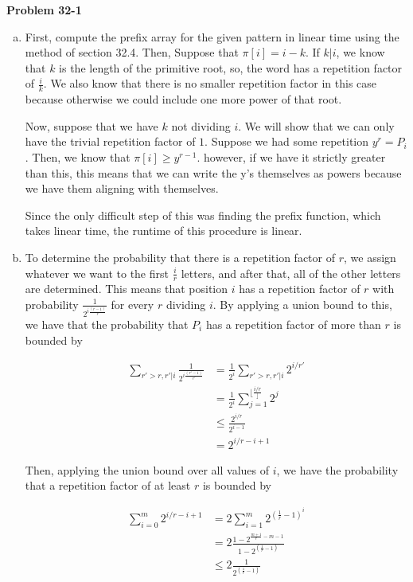 \documentclass{article}
\begin{document}
\noindent\textbf{Problem 32-1}\\
\begin{enumerate}[a.]
\item
First, compute the prefix array for the given pattern in linear time using the method of section 32.4. Then, Suppose that $\pi[i] = i-k$. If $k | i$, we know that $k$ is the length of the primitive root, so, the word has a repetition factor of $\frac{i}{k}$. We also know that there is no smaller repetition factor in this case because otherwise we could include one more power of that root.

Now, suppose that we have $k$ not dividing $i$. We will show that we can only have the trivial repetition factor of $1$. Suppose we had some repetition $y^r = P_i$. Then, we know that $\pi[i] \ge y^{r-1}$. however, if we have it strictly greater than this, this means that we can write the y's themselves as powers because we have them aligning with themselves.

Since the only difficult step of this was finding the prefix function, which takes linear time, the runtime of this procedure is linear.
\item
To determine the probability that there is a repetition factor of $r$, we assign whatever we want to the first $\frac{i}{r}$ letters, and after that, all of the other letters are determined. This means that position $i$ has a repetition factor of $r$ with probability $\frac{1}{2^{i\frac{(r-1)}{r}}}$ for every $r$ dividing $i$. By applying a union bound to this, we have that the probability that $P_i$ has a repetition factor of more than $r$ is bounded by

\begin{align*}
\sum_{r'>r, r'|i} \frac{1}{2^{i\frac{(r'-1)}{r'}}}& = \frac{1}{2^i}\sum_{r'>r, r' |i}2^{i/r'}\\
&= \frac{1}{2^i} \sum_{j=1}^{\lfloor\frac{i/r}\rfloor}2^{j}\\
&\le \frac{2^{i/r}}{2^{i-1}}\\
&=2^{i/r -i +1}
\end{align*}

Then, applying the union bound over all values of $i$, we have the probability that a repetition factor of at least $r$ is bounded by

\begin{align*}
\sum_{i=0}^m 2^{i/r -i +1}& = 2 \sum_{i=1}^m 2^{(\frac{1}{r}-1)^i } \\
&= 2\frac{1-2^{\frac{m+1}{r}-m-1}}{1 - 2^{(\frac{1}{r}-1)}}\\
&\le 2\frac{1}{2^{(\frac{1}{r}-1)}}
\end{align*}


\end{enumerate}
\end{document}
